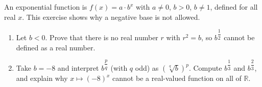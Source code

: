 An exponential function is $f(x)=a\cdot b^x$ with $a\ne0$, $b>0$, $b\ne1$, defined for all real $x$. This exercise shows why a negative base is not allowed.
\begin{enumerate}
\item[(a)] Let $b<0$. Prove that there is no real number $r$ with $r^2=b$, so $b^{\dfrac{1}{2}}$ cannot be defined as a real number.
\item[(b)] Take $b=-8$ and interpret $b^{\dfrac {p}{q}}$ (with $q$ odd) as $\left(\sqrt[q]{b}\right)^p$. Compute $b^{\dfrac{1}{3}}$ and $b^{\dfrac{2}{3}}$, and explain why $x\mapsto(-8)^x$ cannot be a real-valued function on all of $\mathbb R$.
\end{enumerate}
